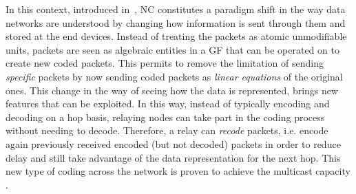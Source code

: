 In this context, introduced in~\cite{ahlswede2000network}, \ac{NC}
constitutes a paradigm shift in the way data networks are understood
by changing how information is sent through them and stored at the end devices.
Instead of treating the packets as atomic
unmodifiable units, packets are seen as algebraic entities in a \ac{GF}
that can be operated on to create new coded packets. This permits to
remove the limitation of sending \textit{specific} packets by now sending
coded packets as \textit{linear equations} of the original ones. This
change in the way of seeing how the data is represented, brings new
features that can be exploited. In this way, instead of typically encoding
and decoding on a hop basis, relaying nodes can take part in the
coding process without needing to decode. Therefore, a relay can
\textit{recode} packets, i.e. encode again previously received encoded
(but not decoded) packets in order to reduce delay and still
take advantage of the data representation for the next hop. This new type
of coding across the network is proven to achieve the multicast
capacity \cite{ahlswede2000network,koetter2003algebraic}.

